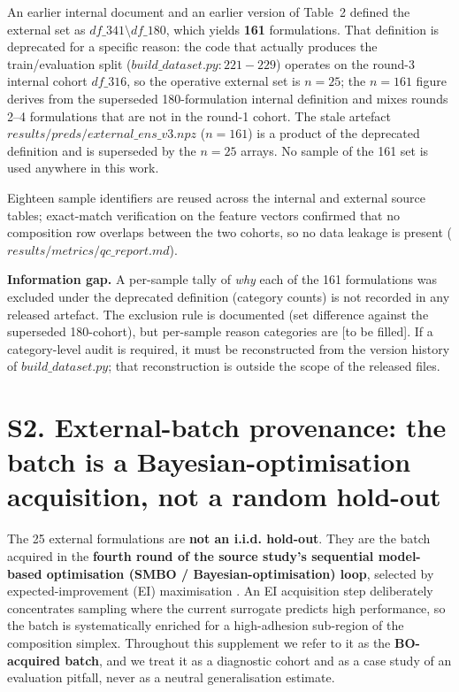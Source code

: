 \documentclass[utf8]{frontiers_suppmat}
\begin{document}
An earlier internal document and an earlier version of Table~2 defined the external set as $df\_341 \setminus df\_180$, which yields \textbf{161} formulations. That definition is deprecated for a specific reason: the code that actually produces the train/evaluation split ($build\_dataset.py{:}221{-}229$) operates on the round-3 internal cohort $df\_316$, so the operative external set is $n = 25$; the $n = 161$ figure derives from the superseded 180-formulation internal definition and mixes rounds 2--4 formulations that are not in the round-1 cohort. The stale artefact $results/preds/external\_ens\_v3.npz$ ($n = 161$) is a product of the deprecated definition and is superseded by the $n = 25$ arrays. No sample of the 161 set is used anywhere in this work.

Eighteen sample identifiers are reused across the internal and external source tables; exact-match verification on the feature vectors confirmed that no composition row overlaps between the two cohorts, so no data leakage is present ($results/metrics/qc\_report.md$).

\textbf{Information gap.} A per-sample tally of \emph{why} each of the 161 formulations was excluded under the deprecated definition (category counts) is not recorded in any released artefact. The exclusion rule is documented (set difference against the superseded 180-cohort), but per-sample reason categories are {[}to be filled{]}. If a category-level audit is required, it must be reconstructed from the version history of $build\_dataset.py$; that reconstruction is outside the scope of the released files.

\section{S2. External-batch provenance: the batch is a Bayesian-optimisation acquisition, not a random hold-out}

The 25 external formulations are \textbf{not an i.i.d. hold-out}. They are the batch acquired in the \textbf{fourth round of the source study's sequential model-based optimisation (SMBO / Bayesian-optimisation) loop}, selected by expected-improvement (EI) maximisation \cite{liao2025nature}. An EI acquisition step deliberately concentrates sampling where the current surrogate predicts high performance, so the batch is systematically enriched for a high-adhesion sub-region of the composition simplex. Throughout this supplement we refer to it as the \textbf{BO-acquired batch}, and we treat it as a diagnostic cohort and as a case study of an evaluation pitfall, never as a neutral generalisation estimate.
\end{document}
